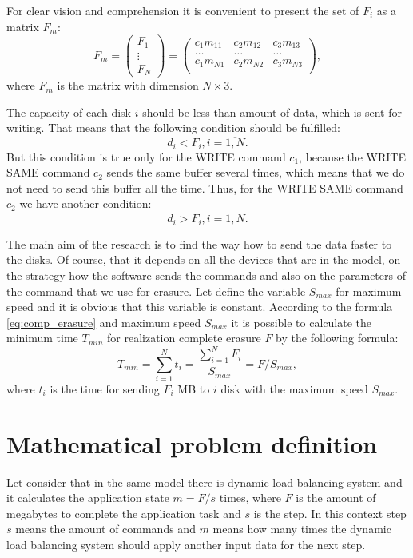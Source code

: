 For clear vision and comprehension it is convenient to present the set of $F_i$ as a matrix $F_m$:
\begin{equation}
	F_m =
	\begin{pmatrix}
		F_1\\ \vdots\\ F_N 
	\end{pmatrix}
	=
	\begin{pmatrix}
		c_1 m_{11} & c_2 m_{12} & c_3 m_{13} \\
		\ldots & \ldots & \ldots \\
		c_1 m_{N1} & c_2 m_{N2} & c_3 m_{N3} \\
	\end{pmatrix},
\end{equation}
where $F_m$ is the matrix with dimension $N\times3$.

The capacity of each disk $i$ should be less than amount of data, which is sent for writing. That means that the following condition should be fulfilled:
\begin{equation}
	d_i < F_i, i=\overline{1,N}.
\end{equation}
But this condition is true only for the WRITE command $c_1$, because the WRITE SAME command $c_2$ sends the same buffer several times, which means that we do not need to send this buffer all the time. Thus, for the WRITE SAME command $c_2$ we have another condition:
\begin{equation}
	d_i > F_i, i=\overline{1,N}.
\end{equation}

The main aim of the research is to find the way how to send the data faster to the disks. Of course, that it depends on all the devices that are in the model, on the strategy how the software sends the commands and also on the parameters of the command that we use for erasure. Let define the variable $S_{max}$ for maximum speed and it is obvious that this variable is constant. According to the formula \ref{eq:comp_erasure} and maximum speed $S_{max}$ it is possible to calculate the minimum time $T_{min}$ for realization complete erasure $F$ by the following formula:
\begin{equation}
\label{eq:time_min}
	T_{min} = \sum_{i=1}^{N}t_i 
			= \frac{\sum_{i=1}^{N}F_i}{S_{max}}
			= F/S_{max},
\end{equation}
where $t_i$ is the time for sending $F_i$ MB to $i$ disk with the maximum speed $S_{max}$. 



\section{Mathematical problem definition}
Let consider that in the same model there is dynamic load balancing system and it calculates the application state $m=F/s$ times, where $F$ is the amount of megabytes to complete the application task and $s$ is the step. In this context step $s$ means the amount of commands and $m$ means how many times the dynamic load balancing system should apply another input data for the next step.

